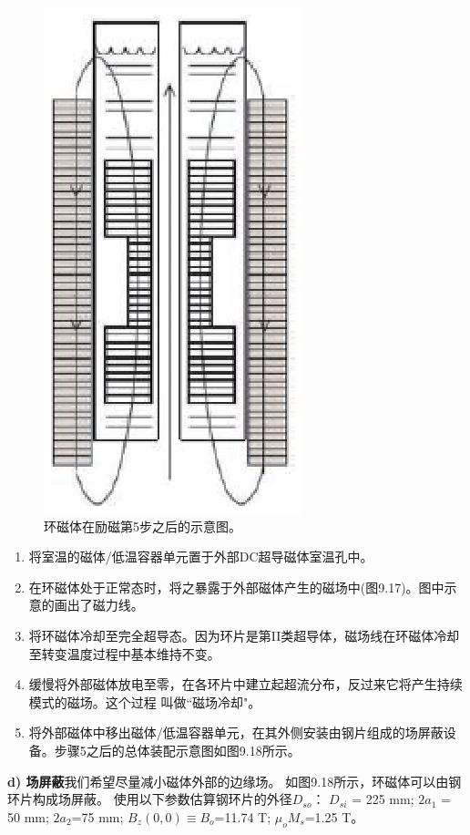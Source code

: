 \begin{figure}
	\centering
	\includegraphics[scale=0.7]{chpt9/figs/fig9.18.eps}
	\caption{环磁体在励磁第5步之后的示意图。}
\end{figure}

\begin{enumerate}
	\item 将室温的磁体/低温容器单元置于外部DC超导磁体室温孔中。
	\item 在环磁体处于正常态时，将之暴露于外部磁体产生的磁场中(图9.17)。图中示意的画出了磁力线。
	\item 将环磁体冷却至完全超导态。因为环片是第II类超导体，磁场线在环磁体冷却至转变温度过程中基本维持不变。
	\item 缓慢将外部磁体放电至零，在各环片中建立起超流分布，反过来它将产生持续模式的磁场。这个过程
	叫做``磁场冷却"。
	\item 将外部磁体中移出磁体/低温容器单元，在其外侧安装由钢片组成的场屏蔽设备。步骤5之后的总体装配示意图如图9.18所示。	
\end{enumerate}

\textbf{d) 场屏蔽}\qquad 我们希望尽量减小磁体外部的边缘场。
如图9.18所示，环磁体可以由钢环片构成场屏蔽。
使用以下参数估算钢环片的外径$D_{so}$：
$D_{si}$ = 225 mm; $2a_1$ = 50 mm;
$2a_2$=75 mm; $B_z(0, 0)\equiv B_o$=11.74 T; $\mu_o M_s$=1.25 T。


